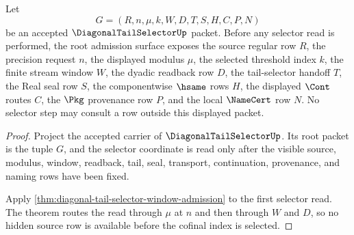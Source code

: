 \begin{theorem}
\label{thm:diagonal-tail-selector-root-cofinal-admission}
Let
$$
G=(R,n,\mu,k,W,D,T,S,H,C,P,N)
$$
be an accepted $\DiagonalTailSelectorUp$ packet. Before any selector read is
performed, the root admission surface exposes the source regular row $R$, the
precision request $n$, the displayed modulus $\mu$, the selected threshold
index $k$, the finite stream window $W$, the dyadic readback row $D$, the
tail-selector handoff $T$, the Real seal row $S$, the componentwise $\hsame$
rows $H$, the displayed $\Cont$ routes $C$, the $\Pkg$ provenance row $P$,
and the local $\NameCert$ row $N$. No selector step may consult a row outside
this displayed packet.
\end{theorem}
\begin{proof}
Project the accepted carrier of $\DiagonalTailSelectorUp$. Its root packet is
the tuple $G$, and the selector coordinate is read only after the visible
source, modulus, window, readback, tail, seal, transport, continuation,
provenance, and naming rows have been fixed.

Apply \autoref{thm:diagonal-tail-selector-window-admission} to the first
selector read. The theorem routes the read through $\mu$ at $n$ and then
through $W$ and $D$, so no hidden source row is available before the
cofinal index is selected.
\end{proof}

